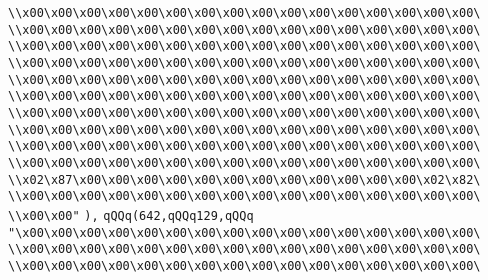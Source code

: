 \verb|\\x00\x00\x00\x00\x00\x00\x00\x00\x00\x00\x00\x00\x00\x00\x00\x00\|\newline
\verb|\\x00\x00\x00\x00\x00\x00\x00\x00\x00\x00\x00\x00\x00\x00\x00\x00\|\newline
\verb|\\x00\x00\x00\x00\x00\x00\x00\x00\x00\x00\x00\x00\x00\x00\x00\x00\|\newline
\verb|\\x00\x00\x00\x00\x00\x00\x00\x00\x00\x00\x00\x00\x00\x00\x00\x00\|\newline
\verb|\\x00\x00\x00\x00\x00\x00\x00\x00\x00\x00\x00\x00\x00\x00\x00\x00\|\newline
\verb|\\x00\x00\x00\x00\x00\x00\x00\x00\x00\x00\x00\x00\x00\x00\x00\x00\|\newline
\verb|\\x00\x00\x00\x00\x00\x00\x00\x00\x00\x00\x00\x00\x00\x00\x00\x00\|\newline
\verb|\\x00\x00\x00\x00\x00\x00\x00\x00\x00\x00\x00\x00\x00\x00\x00\x00\|\newline
\verb|\\x00\x00\x00\x00\x00\x00\x00\x00\x00\x00\x00\x00\x00\x00\x00\x00\|\newline
\verb|\\x00\x00\x00\x00\x00\x00\x00\x00\x00\x00\x00\x00\x00\x00\x00\x00\|\newline
\verb|\\x02\x87\x00\x00\x00\x00\x00\x00\x00\x00\x00\x00\x00\x00\x02\x82\|\newline
\verb|\\x00\x00\x00\x00\x00\x00\x00\x00\x00\x00\x00\x00\x00\x00\x00\x00\|\newline
\verb|\\x00\x00"|\newline
\verb|),|\newline
\verb|qQQq(642,qQQq129,qQQq|\newline
\verb|"\x00\x00\x00\x00\x00\x00\x00\x00\x00\x00\x00\x00\x00\x00\x00\x00\|\newline
\verb|\\x00\x00\x00\x00\x00\x00\x00\x00\x00\x00\x00\x00\x00\x00\x00\x00\|\newline
\verb|\\x00\x00\x00\x00\x00\x00\x00\x00\x00\x00\x00\x00\x00\x00\x00\x00\|\newline
